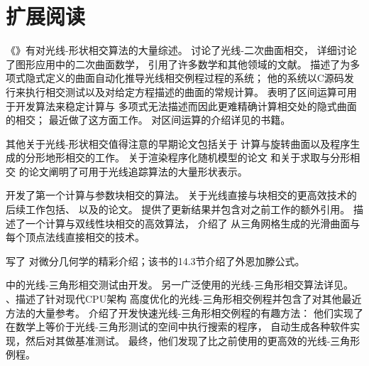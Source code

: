 \section{扩展阅读}\label{sec:扩展阅读03}
《》有对光线-形状相交算法的大量综述\citep{10.5555/94788}。
\citet{doi:10.1177/003754977101600104}讨论了光线-二次曲面相交，
\citet{Heckbert84themathematics}详细讨论了图形应用中的二次曲面数学，
引用了许多数学和其他领域的文献。
\citet{10.1145/964967.801136}描述了为多项式隐式定义的曲面自动化推导光线相交例程过程的系统；
他的系统以C源码发行来执行相交测试以及对给定方程描述的曲面的常规计算。
\citet{10.5555/93267.93276}表明了区间运算可用于开发算法来稳定计算与
多项式无法描述而因此更难精确计算相交处的隐式曲面的相交；
\citet{10.1111/j.1467-8659.2008.01189.x}最近做了这方面工作。
对区间运算的介绍详见\citet{moore1966interval}的书籍。

其他关于光线-形状相交值得注意的早期论文包括\citet{10.1145/800059.801137}关于
计算与旋转曲面以及程序生成的分形地形相交的工作。
\citet{10.1145/358523.358553}关于渲染程序化随机模型的论文
和\citet{10.1145/74333.74363}关于求取与分形相交
的论文阐明了可用于光线追踪算法的大量形状表示。

\citet{10.1145/800064.801287}开发了第一个计算与参数块相交的算法。
关于光线直接与块相交的更高效技术的后续工作包括\citet{722295}、
\citet{doi:10.1080/10867651.2000.10487519}
以及\citet{https://doi.org/10.1111/1467-8659.00535}的论文。
\citet{doi:10.1080/2151237X.2006.10129218}
提供了更新结果并包含对之前工作的额外引用。
\citet{doi:10.1080/10867651.2004.10504896}描述了一个计算与双线性块相交的高效算法，
\citet{10.1111/j.1467-8659.2011.01993.x}介绍了
从三角网格生成的光滑曲面与每个顶点法线直接相交的技术。

\citet{gray2017modern}写了
对微分几何学的精彩介绍；该书的14.3节介绍了外恩加滕公式。

中的光线-三角形相交测试由\citet{Woop2013Watertight}开发。
另一广泛使用的光线-三角形相交算法详见\citet{doi:10.1080/10867651.1997.10487468}。
\citet{doi:10.1080/2151237X.2005.10129208}、\citet{shevtsov2007ray}描述了针对现代CPU架构
高度优化的光线-三角形相交例程并包含了对其他最近方法的大量参考。
\citet{4061543}介绍了开发快速光线-三角形相交例程的有趣方法：
他们实现了在数学上等价于光线-三角形测试的空间中执行搜索的程序，
自动生成各种软件实现，然后对其做基准测试。
最终，他们发现了比之前使用的更高效的光线-三角形例程。

